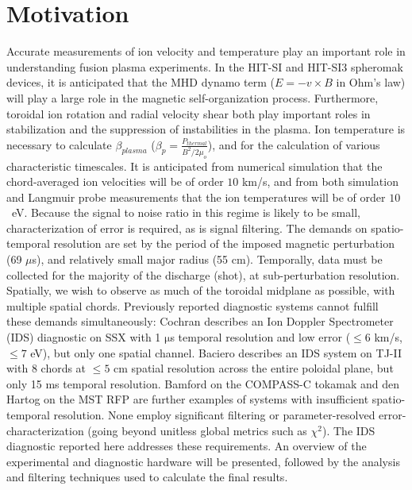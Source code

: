 	
	\section{Motivation}
	\hspace{4ex}Accurate measurements of ion velocity and temperature play an important role in understanding fusion plasma experiments. In the HIT-SI and HIT-SI3 spheromak devices, it is anticipated that the MHD dynamo term ($E=-v\times{B}$ in Ohm's law) will play a large role in the magnetic self-organization process\cite{akcay2013extended}. Furthermore, toroidal ion rotation and radial velocity shear both play important roles in stabilization and the suppression of instabilities in the plasma. Ion temperature is necessary to calculate $\beta_{plasma}$ ($\beta_p = \frac{P_{thermal}}{B^2/2\mu_o}$), and for the calculation of various characteristic timescales. It is anticipated from numerical simulation\cite{akcay2013extended} that the chord-averaged ion velocities will be of order $10$ km/s, and from both simulation and Langmuir probe measurements that the ion temperatures will be of order $10$~eV. Because the signal to noise ratio in this regime is likely to be small, characterization of error is required, as is signal filtering. The demands on spatio-temporal resolution are set by the period of the imposed magnetic perturbation (69 $\mu$s), and relatively small major radius (55 cm). Temporally, data must be collected for the majority of the discharge (shot), at sub-perturbation resolution. Spatially, we wish to observe as much of the toroidal midplane as possible, with multiple spatial chords. Previously reported diagnostic systems cannot fulfill these demands simultaneously: Cochran \cite{cothran2006fast} describes an Ion Doppler Spectrometer (IDS) diagnostic on SSX with 1 $\mathrm{\mu}$s temporal resolution and low error ($\leq6$ km/s, $\leq7$ eV), but only one spatial channel. Baciero \cite{Baciero2001JT-II} describes an IDS system on TJ-II with 8 chords at $\leq5$ cm spatial resolution across the entire poloidal plane, but only 15 ms temporal resolution. Bamford \cite{bamford1992combination} on the COMPASS-C tokamak and den Hartog \cite{den1994fast} on the MST RFP are further examples of systems with insufficient spatio-temporal resolution. None employ significant filtering or parameter-resolved error-characterization (going beyond unitless global metrics such as $\chi^2$). The IDS diagnostic reported here addresses these requirements. An overview of the experimental and diagnostic hardware will be presented, followed by the analysis and filtering techniques used to calculate the final results.
	
